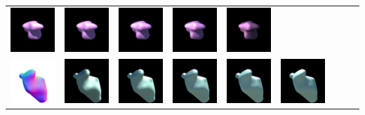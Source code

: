 \begin{center}
\begin{longtable}{@{}c@{}c@{}c@{}c@{}c@{}c@{}c@{}c@{}c@{}}
\includegraphics[width=0.1\linewidth]{training/10_3.png} & \includegraphics[width=0.1\linewidth]{training/10_4.png} &
\includegraphics[width=0.1\linewidth]{training/10_5.png} & \includegraphics[width=0.1\linewidth]{training/10_6.png} &
\includegraphics[width=0.1\linewidth]{training/10_7.png} \\
\includegraphics[width=0.1\linewidth]{training/11_gt.png} & \includegraphics[width=0.1\linewidth]{training/11_0.png} &
\includegraphics[width=0.1\linewidth]{training/11_1.png} & \includegraphics[width=0.1\linewidth]{training/11_2.png} &
\includegraphics[width=0.1\linewidth]{training/11_3.png} & \includegraphics[width=0.1\linewidth]{training/11_4.png} &

\end{longtable}
\end{center}
